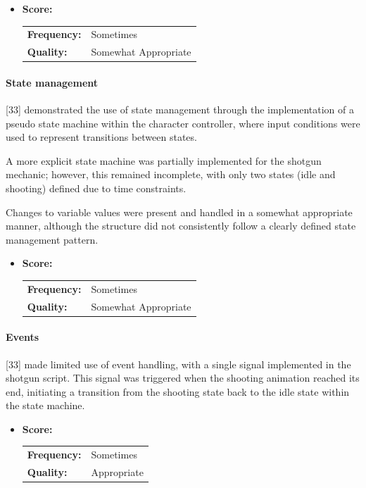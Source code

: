 \begin{itemize}
    \item \textbf{Score:}
    \begin{tabular}{ll}
        \textbf{Frequency:} & Sometimes \\
        \textbf{Quality:}   & Somewhat Appropriate \\
    \end{tabular}
\end{itemize}

\paragraph{State management}


[33] demonstrated the use of state management through the implementation of a pseudo state machine within the character controller, where input conditions were used to represent transitions between states.

A more explicit state machine was partially implemented for the shotgun mechanic; however, this remained incomplete, with only two states (idle and shooting) defined due to time constraints.

Changes to variable values were present and handled in a somewhat appropriate manner, although the structure did not consistently follow a clearly defined state management pattern.


\begin{itemize}
    \item \textbf{Score:}
    \begin{tabular}{ll}
        \textbf{Frequency:} & Sometimes \\
        \textbf{Quality:}   & Somewhat Appropriate \\
    \end{tabular}
\end{itemize}

\paragraph{Events}


[33] made limited use of event handling, with a single signal implemented in the shotgun script.
This signal was triggered when the shooting animation reached its end, initiating a transition from the shooting state back to the idle state within the state machine.



\begin{itemize}
    \item \textbf{Score:}
    \begin{tabular}{ll}
        \textbf{Frequency:} & Sometimes \\
        \textbf{Quality:}   & Appropriate \\
    \end{tabular}
\end{itemize}



